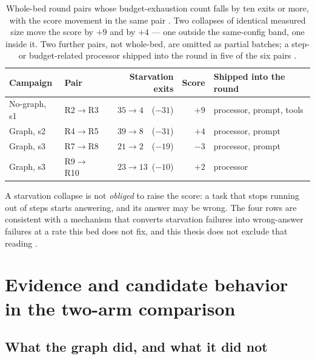 \begin{table}[htbp]
\centering\small
\begin{tabular}{llrrl}
\toprule
Campaign & Pair & Starvation exits & Score & Shipped into the round \\
\midrule
No-graph, s1 & R2$\to$R3  & $35 \to 4$\ \ ($-31$)  & $+9$ & processor, prompt, tools \\
Graph, s2   & R4$\to$R5  & $39 \to 8$\ \ ($-31$)  & $+4$ & processor, prompt \\
Graph, s3   & R7$\to$R8  & $21 \to 2$\ \ ($-19$)  & $-3$ & processor, prompt \\
Graph, s3   & R9$\to$R10 & $23 \to 13$\ ($-10$)   & $+2$ & processor \\
\bottomrule
\end{tabular}
\caption[Budget-exhaustion reductions and associated score changes]{Whole-bed
round pairs whose budget-exhaustion count falls by ten exits or more, with
the score movement in the same pair . Two collapses of identical
measured size move the score by $+9$ and by $+4$ --- one outside the
same-config band, one inside it. Two further pairs, not whole-bed, are
omitted as partial batches; a step- or budget-related processor shipped
into the round in five of the six pairs .}
\label{tab:starvation}
\end{table}

A starvation collapse is not \emph{obliged} to raise the score: a task that stops running out of steps starts
answering, and its answer may be wrong. The four rows are consistent with a
mechanism that converts starvation failures into wrong-answer failures at a
rate this bed does not fix, and this thesis does not exclude that reading
.


\section{Evidence and candidate behavior in the two-arm comparison}

\subsection{What the graph did, and what it did not}
\label{sec:what-graph-did}

